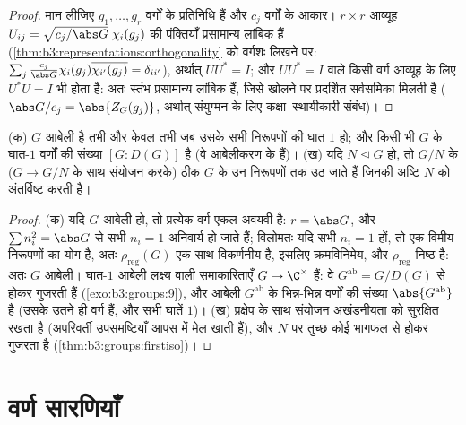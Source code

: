\begin{proof}
मान लीजिए $g_1, \dots, g_r$ वर्गों के प्रतिनिधि हैं और $c_j$ वर्गों के आकार।
$r \times r$ आव्यूह $U_{ij} =
\sqrt{c_j/\abs G}\;\chi_i(g_j)$ की पंक्तियाँ प्रसामान्य लांबिक हैं (\cref{thm:b3:representations:orthogonality} को
वर्गशः लिखने पर: $\sum_j \frac{c_j}{\abs G}\chi_i(g_j)\overline{\chi_{i'}(g_j)} =
\delta_{ii'}$), अर्थात् $UU^* = I$; और $UU^* =
I$ वाले किसी वर्ग
आव्यूह के लिए $U^*U = I$ भी होता है: अतः स्तंभ प्रसामान्य लांबिक हैं,
जिसे खोलने पर प्रदर्शित सर्वसमिका मिलती है ($\abs G/c_j = \abs{Z_G(g_j)}$, अर्थात्
संयुग्मन के लिए कक्षा--स्थायीकारी संबंध)।
\end{proof}

\begin{proposition}[एक-विमीय वर्ण; उन्नयन]
\label{prop:b3:representations:onedim}
(क) $G$ आबेली है तभी और केवल तभी जब उसके सभी  निरूपणों
की घात $1$ हो; और किसी भी $G$ के घात-$1$ वर्णों की संख्या
$[G : D(G)]$ है (वे आबेलीकरण के  हैं)।
(ख) यदि $N \trianglelefteq G$ हो, तो $G/N$ के  ($G \to G/N$ के साथ
संयोजन करके) ठीक $G$ के उन  निरूपणों तक उठ जाते हैं
जिनकी अष्टि $N$ को अंतर्विष्ट करती है।
\end{proposition}

\begin{proof}
(क) यदि $G$ आबेली हो, तो प्रत्येक वर्ग एकल-अवयवी है: $r = \abs G$,
और $\sum n_i^2 = \abs G$ से सभी $n_i = 1$ अनिवार्य हो जाते हैं; विलोमतः यदि सभी
$n_i = 1$ हों, तो  एक-विमीय निरूपणों का योग है, अतः
$\rho_{\mathrm{reg}}(G)$ एक साथ विकर्णनीय है, इसलिए क्रमविनिमेय, और $\rho_{\mathrm{reg}}$ निष्ठ
है: अतः $G$ आबेली। घात-$1$  आबेली लक्ष्य वाली
समाकारिताएँ $G \to \C^\times$ हैं: वे $G^{\mathrm{ab}} = G/D(G)$ से होकर गुजरती हैं (\cref{exo:b3:groups:9}), और
आबेली $G^{\mathrm{ab}}$ के भिन्न-भिन्न वर्णों की संख्या $\abs{G^{\mathrm{ab}}}$ है (उसके उतने
ही वर्ग हैं, और सभी घातें $1$)। (ख) प्रक्षेप के साथ संयोजन
अखंडनीयता को सुरक्षित रखता है (अपरिवर्ती उपसमष्टियाँ आपस में मेल
खाती हैं), और $N$ पर तुच्छ कोई  भागफल से होकर गुजरता है
(\cref{thm:b3:groups:firstiso})।
\end{proof}

\section{वर्ण सारणियाँ}

